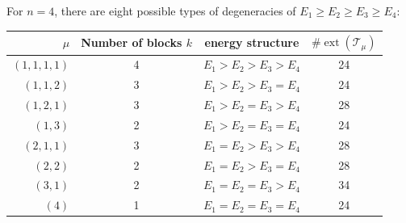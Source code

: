 \documentclass[11pt,a4paper,longbibliography]{amsart}
\numberwithin{equation}{section}
\theoremstyle{plain}
\theoremstyle{definition}
\theoremstyle{remark}
\begin{document}
	For $n=4$, there are eight possible types of degeneracies of 
	$E_1 \ge E_2 \ge E_3 \ge E_4$:
	
	\begin{table}[h]
		\centering
		\begin{tabular}{r|c|c|c}
			$\mu$ & Number of blocks $k$ & energy structure &  $\#\operatorname{ext}(\mathcal{T}_{\mu})$ \\
			\hline
			$(1,1,1,1)$ & 4 & $E_1>E_2>E_3>E_4$ & 24\\
			$(1,1,2)$ & 3 & $E_1>E_2>E_3=E_4$ &24\\
			$(1,2,1)$ & 3 & $E_1>E_2=E_3>E_4$ &28\\
			$(1,3)$ & 2 & $E_1>E_2=E_3=E_4$ & 24\\
			$(2,1,1)$ & 3 & $E_1=E_2>E_3>E_4$ & 28\\
			$(2,2)$ & 2 & $E_1=E_2>E_3=E_4$ & 28\\
			$(3,1)$ & 2 & $E_1=E_2=E_3>E_4$ & 34\\
			$(4)$ & 1 & $E_1=E_2=E_3=E_4$ & 24
		\end{tabular}
	\end{table}
	
\end{document}
